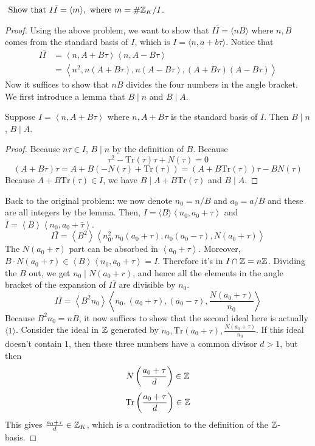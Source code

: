 \documentclass[12pt,twoside=semi,openright,numbers=noenddot]{scrbook}
\begin{document}
\begin{problem}
    $\text { Show that } I \bar{I}=\langle m\rangle, \text { where } m=\# \mathbb Z_{K} / I$.
\end{problem}
    \begin{proof}
        Using the above problem, we want to show that $I\bar{I} = \langle nB \rangle$ where $n,B$ comes from the standard basis of $I$, which is 
        $I = \langle n, a+b\tau \rangle$.
        Notice that 
        \begin{align*}
            I\bar{I} &= \left\langle n, A+B\tau \right\rangle \left\langle n, A-B\tau\right\rangle \\
            &= \left\langle n^2, n(A+B\tau), n(A-B\tau), (A+B\tau)(A-B\tau)\right\rangle 
        \end{align*}
        Now it suffices to show that $nB$ divides the four numbers in the angle bracket. We first introduce a lemma that 
        $B \mid n$ and $B \mid A$. 
        \begin{lemma}
            Suppose $I = \left\langle n, A+B\tau\right\rangle$ where $n, A+B\tau$ is the standard basis of $I$. Then $B \mid n$, $B\mid A$. 
        \end{lemma}
            \begin{proof}
                Because $n\tau \in I$, $B \mid n$ by the definition of $B$. Because 
                $$\tau^2-\text{Tr}(\tau)\tau+N(\tau)=0$$
                $$(A+B\tau)\tau=A+B(-N(\tau)+\text{Tr}(\tau)) = (A+B\text{Tr}(\tau))\tau - BN(\tau)$$
                Because $A+B\text{Tr}(\tau) \in I$, we have $B \mid A+B\text{Tr}(\tau)$ and $B \mid A$.
            \end{proof}
        Back to the original problem: we now denote $n_0 = n/B$ and $a_0 = a/B$ and these are all integers by the lemma.
        Then, $I = \langle B \rangle \left\langle n_0, a_0 + \tau\right\rangle$ and 
        $\bar{I} = \left\langle B\right\rangle \left\langle n_0, a_0 +\bar{\tau}\right\rangle$.
        $$ I\bar{I} = \left\langle B^2\right\rangle \left\langle n_0^2, n_0(a_0+\tau), n_0(a_0-\tau), N(a_0+\tau)\right\rangle $$
        The $N(a_0+\tau)$ part can be absorbed in $\left\langle a_0+\tau\right\rangle$. Moreover, $B\cdot N(a_0+\tau) \in \left\langle B \right\rangle 
        \left\langle n_0, a_0+\tau\right\rangle = I$. Therefore it's in $I \cap \mathbb Z = n\mathbb Z$. Dividing the $B$ out, we get $n_0 \mid N(a_0+r)$, and hence 
        all the elements in the angle bracket of the expansion of $I\bar{I}$ are divisible by $n_0$. 
        $$ I\bar{I} = \left\langle B^2n_0\right\rangle \left\langle n_0, (a_0+\tau), (a_0-\tau), \frac{N(a_0+\tau)}{n_0}\right\rangle $$
        Because $B^2n_0 = nB$, it now suffices to show that the second ideal here is actually $\langle 1 \rangle$.
        Consider the ideal in $\mathbb Z$ generated by $n_0, \text{Tr}(a_0+\tau), \frac{N(a_0+\tau)}{n_0}$. If this ideal doesn't contain $1$, 
        then these three numbers have a common divisor $d > 1$, but then 
        $$ N\left(\frac{a_0+\tau}{d}\right) \in \mathbb Z$$
        $$ \text{Tr}\left(\frac{a_0+\tau}{d}\right) \in \mathbb Z$$
        This gives $\frac{a_0+\tau}{d} \in \mathbb Z_K$, which is a contradiction to the definition of the $\mathbb Z$-basis.

    \end{proof}
\end{document}
